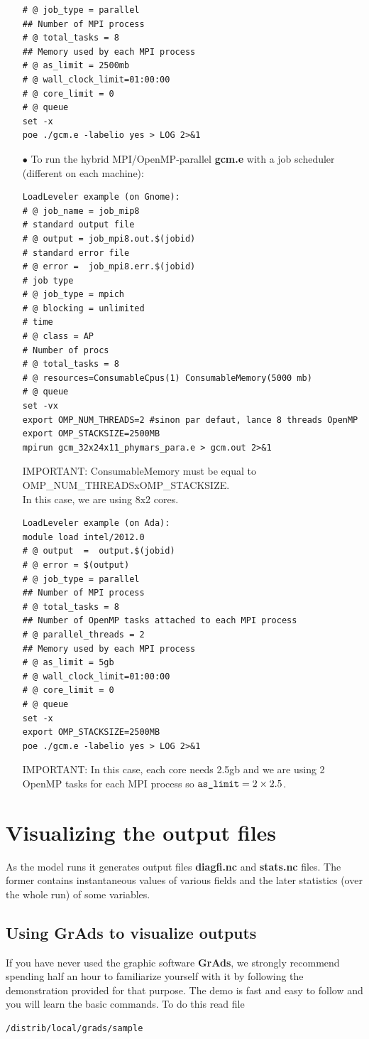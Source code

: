 \begin{itemize}
\begin{verbatim}
# @ job_type = parallel
## Number of MPI process
# @ total_tasks = 8
## Memory used by each MPI process
# @ as_limit = 2500mb 
# @ wall_clock_limit=01:00:00
# @ core_limit = 0
# @ queue
set -x
poe ./gcm.e -labelio yes > LOG 2>&1
\end{verbatim}
\item[$\bullet$] To run the hybrid MPI/OpenMP-parallel {\bf gcm.e} with a job scheduler (different on each machine):
\begin{verbatim}
LoadLeveler example (on Gnome):
# @ job_name = job_mip8
# standard output file  
# @ output = job_mpi8.out.$(jobid)
# standard error file
# @ error =  job_mpi8.err.$(jobid)
# job type
# @ job_type = mpich
# @ blocking = unlimited
# time
# @ class = AP
# Number of procs 
# @ total_tasks = 8
# @ resources=ConsumableCpus(1) ConsumableMemory(5000 mb)
# @ queue
set -vx
export OMP_NUM_THREADS=2 #sinon par defaut, lance 8 threads OpenMP
export OMP_STACKSIZE=2500MB
mpirun gcm_32x24x11_phymars_para.e > gcm.out 2>&1
\end{verbatim}
IMPORTANT: ConsumableMemory must be equal to OMP\_NUM\_THREADSxOMP\_STACKSIZE.\\
In this case, we are using 8x2 cores.
\begin{verbatim}
LoadLeveler example (on Ada):
module load intel/2012.0
# @ output  =  output.$(jobid)
# @ error = $(output)
# @ job_type = parallel
## Number of MPI process
# @ total_tasks = 8
## Number of OpenMP tasks attached to each MPI process
# @ parallel_threads = 2
## Memory used by each MPI process
# @ as_limit = 5gb 
# @ wall_clock_limit=01:00:00
# @ core_limit = 0
# @ queue
set -x
export OMP_STACKSIZE=2500MB
poe ./gcm.e -labelio yes > LOG 2>&1
\end{verbatim}
IMPORTANT: In this case, each core needs 2.5gb and we are using 2 OpenMP tasks for each MPI process so $\verb|as_limit|=2 \times 2.5$.
\end{itemize}
\section{Visualizing the output files}

As the model runs it generates output files {\bf diagfi.nc} and
{\bf stats.nc} files. The former contains instantaneous values of
various fields and the later statistics (over the whole run) of some
variables.

\subsection{Using GrAds to visualize outputs}
If you have never used the graphic software {\bf GrAds}, we strongly
recommend spending half an hour to familiarize yourself with it by following
the demonstration provided for that purpose.
The demo is fast and easy to follow and you will learn the basic commands.
To do this read file
\begin{verbatim}
/distrib/local/grads/sample
\end{verbatim}

